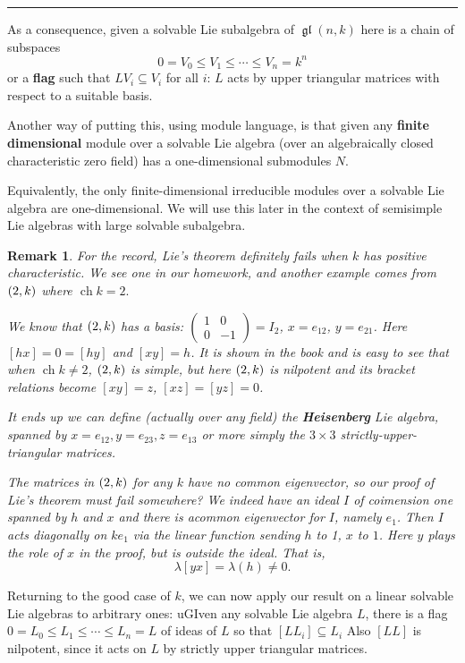 \documentclass[12pt]{article}
\theoremstyle{nonumberbreak}
\theoremstyle{changebreak}
\theoremstyle{nonumberbreak}
\theoremstyle{change}
\newtheorem{rmk}[thm]{Remark}
\newcommand*{\brk}{
\rule{2in}{.1pt}
}
\DeclareMathOperator{\ch}{ch}
\DeclareMathOperator{\gl}{\mathfrak{gl}}
\let\sl\relax
\DeclareMathOperator{\sl}{\mathfrak{sl}}
\begin{document}
\brk

As a consequence, given a solvable Lie subalgebra of $\gl(n,k)$ here is a chain of subspaces
\[0=V_0\le V_1\le\cdots\le V_n=k^n\]
or a \textbf{flag} such that $LV_i\subseteq V_i$ for all $i$: $L$ acts by upper triangular 
matrices with respect to a suitable basis.

Another way of putting this, using module language, is that given any \textbf{finite dimensional} module over
a solvable Lie algebra (over an algebraically closed characteristic zero field) has a one-dimensional submodules $N$.

Equivalently, the only finite-dimensional irreducible modules over a solvable Lie algebra are one-dimensional. We 
will use this later in the context of semisimple Lie algebras with large solvable subalgebra.

\begin{rmk}
	For the record, Lie's theorem \textit{definitely fails} when $k$ has positive characteristic.
	We see one in our homework, and another example comes from $\sl(2,k)$ where $\ch k=2.$

	We know that $\sl(2,k)$ has a basis: $(\begin{smallmatrix}
		1&0\\0&-1
	\end{smallmatrix})=I_2$, $x=e_{12}$, $y=e_{21}$. Here $[hx]=0=[hy]$ and $[xy]=h$. It is shown in the book
	and is easy to see that when $\ch k\ne 2$, $\sl(2,k)$ is simple, but here $\sl(2,k)$ is nilpotent and its
	bracket relations become $[xy]=z$, $[xz]=[yz]=0$.

	It ends up we can define (actually over any field) the \textbf{Heisenberg} Lie algebra, spanned
	by $x=e_{12},y=e_{23},z=e_{13}$ or more simply the $3\times 3$ strictly-upper-triangular matrices.

	The matrices in $\sl(2,k)$ for any $k$ have no common eigenvector, so our proof of Lie's theorem must
	fail somewhere? We indeed have an ideal $I$ of coimension one spanned by $h$ and $x$ and there is acommon eigenvector for $I$, 
	namely $e_1$. Then $I$ acts diagonally on $ke_1$ via the linear function sending $h$ to 1, $x$ to $1$. 
	Here $y$ plays the role of $x$ in the proof, but is outside the ideal. That is,
	\[\lambda[yx]=\lambda(h)\ne 0.\]
\end{rmk}

Returning to the good case of $k$, we can now apply our result on a linear solvable Lie algebras to arbitrary ones:
uGIven any solvable Lie algebra $L$, there is a flag $0=L_0\le L_1\le\cdots\le L_n=L$ of ideas of $L$
so that $[LL_i]\subseteq L_i$ Also $[LL]$ is nilpotent, since it acts on $L$ by strictly upper triangular matrices.
\end{document}
